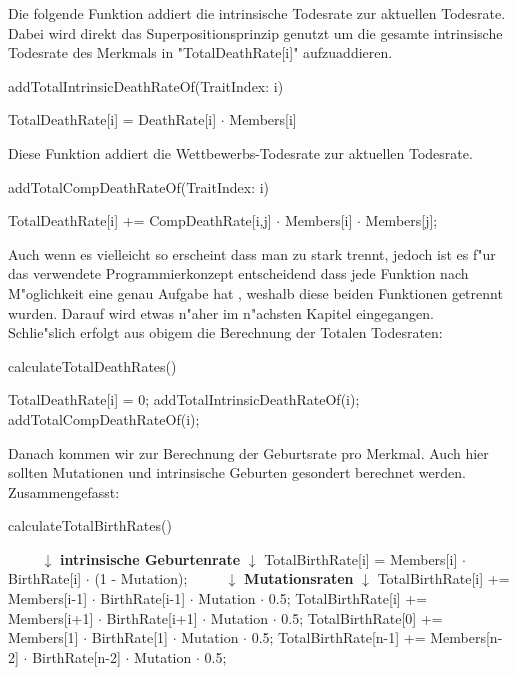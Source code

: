 \documentclass[11pt, a4paper, german]{article}
\theoremstyle{plain}
\begin{document}
	Die folgende Funktion addiert die intrinsische Todesrate zur aktuellen Todesrate. Dabei wird direkt das Superpositionsprinzip genutzt um die gesamte intrinsische Todesrate des Merkmals in "{}TotalDeathRate[i]"{} aufzuaddieren.
	\begin{algorithm}[H]
		\caption{addTotalIntrinsicDeathRateOf(TraitIndex: i)}
		\begin{algorithmic}[1]
			\State TotalDeathRate[i] = DeathRate[i] $ \cdot $ Members[i]
		\end{algorithmic}
	\end{algorithm}
	Diese Funktion addiert die Wettbewerbs-Todesrate zur aktuellen Todesrate.
	\begin{algorithm}[H]
		\caption{addTotalCompDeathRateOf(TraitIndex: i)}
		\begin{algorithmic}[1]
				\State TotalDeathRate[i] += CompDeathRate[i,j] $ \cdot $ Members[i] $ \cdot $ Members[j];
			\EndFor
		\end{algorithmic}
	\end{algorithm}
	Auch wenn es vielleicht so erscheint dass man zu stark trennt, jedoch ist es f"ur das verwendete Programmierkonzept entscheidend dass jede Funktion nach M"oglichkeit eine genau Aufgabe hat \cite{martin2008clean}, weshalb diese beiden Funktionen getrennt wurden. Darauf wird etwas n"aher im n"achsten Kapitel eingegangen. \\
	Schlie"slich erfolgt aus obigem die Berechnung der Totalen Todesraten:
	\begin{algorithm}[H]
		\caption{calculateTotalDeathRates()}
		\begin{algorithmic}[1]
				\State TotalDeathRate[i] = 0;
				\State addTotalIntrinsicDeathRateOf(i);
				\State addTotalCompDeathRateOf(i);
			\EndFor
		\end{algorithmic}
	\end{algorithm}
	Danach kommen wir zur Berechnung der Geburtsrate pro Merkmal. Auch hier sollten Mutationen und intrinsische Geburten gesondert berechnet werden. Zusammengefasst:
	\begin{algorithm}[H]
		\caption{calculateTotalBirthRates()}
		\begin{algorithmic}[1]
			\State $ \qquad $ $ \downarrow $ \textbf{intrinsische Geburtenrate} $ \downarrow $
				\State TotalBirthRate[i] = Members[i] $ \cdot $ BirthRate[i] $ \cdot $ (1 - Mutation);
			\EndFor
			\State $ \qquad $ $ \downarrow $ \textbf{Mutationsraten} $ \downarrow $
				\State TotalBirthRate[i] += Members[i-1] $ \cdot $ BirthRate[i-1] $ \cdot $ Mutation $ \cdot $ 0.5;
				\State TotalBirthRate[i] += Members[i+1] $ \cdot $ BirthRate[i+1] $ \cdot $ Mutation $ \cdot $ 0.5;
			\EndFor
			\State TotalBirthRate[0] += Members[1] $ \cdot $ BirthRate[1] $ \cdot $ Mutation $ \cdot $ 0.5;
			\State TotalBirthRate[n-1] += Members[n-2] $ \cdot $ BirthRate[n-2] $ \cdot $ Mutation $ \cdot $ 0.5;
		\end{algorithmic}
	\end{algorithm}
\end{document}
